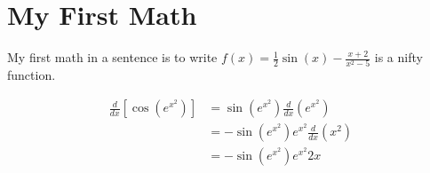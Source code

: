 \documentclass{article}
\begin{document}
\newpage

\section{My First Math}

My first math in a sentence is to write \( f(x) = \frac{1}{2} \sin(x) - \frac{x+2}{x^2-5} \) is a nifty function.


\begin{align*}  %
    \frac{d}{dx} \left[ \cos \left( e^{x^2} \right) \right] &= \sin \left( e^{x^2} \right) \frac{d}{dx} \left( e^{x^2} \right) \\
    &= -\sin \left( e^{x^2} \right) e^{x^2} \frac{d}{dx} \left( x^2 \right) \\
    &= -\sin \left( e^{x^2} \right) e^{x^2} 2x
\end{align*}
\end{document}
